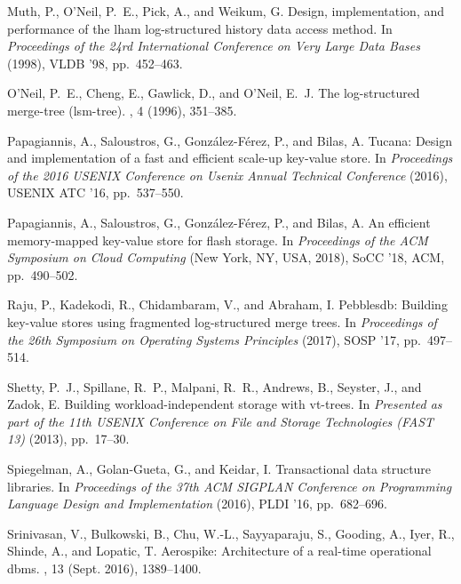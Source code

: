\documentclass[sigplan,10pt]{acmart}
\begin{document}
\begin{thebibliography}{10}
{\sc Muth, P., O'Neil, P.~E., Pick, A., and Weikum, G.}
\newblock Design, implementation, and performance of the lham log-structured
  history data access method.
\newblock In {\em Proceedings of the 24rd International Conference on Very
  Large Data Bases\/} (1998), VLDB '98, pp.~452--463.

{\sc O'Neil, P.~E., Cheng, E., Gawlick, D., and O'Neil, E.~J.}
\newblock The log-structured merge-tree (lsm-tree).
, 4 (1996), 351--385.

{\sc Papagiannis, A., Saloustros, G., Gonz\'{a}lez-F{\'e}rez, P., and Bilas,
  A.}
\newblock Tucana: Design and implementation of a fast and efficient scale-up
  key-value store.
\newblock In {\em Proceedings of the 2016 USENIX Conference on Usenix Annual
  Technical Conference\/} (2016), USENIX ATC '16, pp.~537--550.

{\sc Papagiannis, A., Saloustros, G., Gonz\'{a}lez-F{\'e}rez, P., and Bilas,
  A.}
\newblock An efficient memory-mapped key-value store for flash storage.
\newblock In {\em Proceedings of the ACM Symposium on Cloud Computing\/} (New
  York, NY, USA, 2018), SoCC '18, ACM, pp.~490--502.

{\sc Raju, P., Kadekodi, R., Chidambaram, V., and Abraham, I.}
\newblock Pebblesdb: Building key-value stores using fragmented log-structured
  merge trees.
\newblock In {\em Proceedings of the 26th Symposium on Operating Systems
  Principles\/} (2017), SOSP '17, pp.~497--514.

{\sc Shetty, P.~J., Spillane, R.~P., Malpani, R.~R., Andrews, B., Seyster, J.,
  and Zadok, E.}
\newblock Building workload-independent storage with vt-trees.
\newblock In {\em Presented as part of the 11th {USENIX} Conference on File and
  Storage Technologies ({FAST} 13)\/} (2013), pp.~17--30.

{\sc Spiegelman, A., Golan-Gueta, G., and Keidar, I.}
\newblock Transactional data structure libraries.
\newblock In {\em Proceedings of the 37th ACM SIGPLAN Conference on Programming
  Language Design and Implementation\/} (2016), PLDI '16, pp.~682--696.

{\sc Srinivasan, V., Bulkowski, B., Chu, W.-L., Sayyaparaju, S., Gooding, A.,
  Iyer, R., Shinde, A., and Lopatic, T.}
\newblock Aerospike: Architecture of a real-time operational dbms.
, 13 (Sept. 2016), 1389--1400.


\end{thebibliography}
\end{document}
